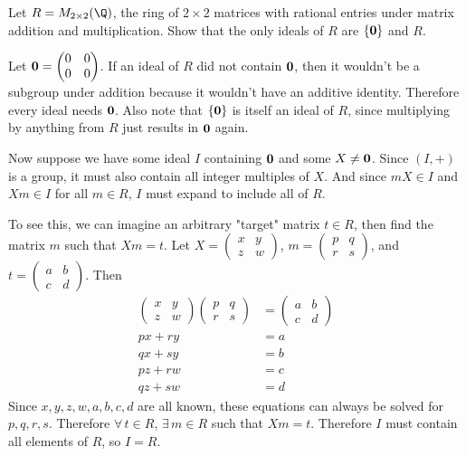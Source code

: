 \documentclass[a4paper]{article}
\begin{document}

\begin{questionbody}
Let $R = M_{2 \times 2}(\Q)$, the ring of $2 \times 2$ matrices with rational entries under matrix addition and multiplication. Show that the only ideals of $R$ are $\{\bf 0\}$ and $R$.
\end{questionbody}

Let $\bf 0 = \begin{pmatrix}0 & 0\\ 0 & 0\end{pmatrix}$. If an ideal of $R$ did not contain $\bf 0$, then it wouldn't be a subgroup under addition because it wouldn't have an additive identity. Therefore every ideal needs $\bf 0$. Also note that $\{ \bf 0 \}$ is itself an ideal of $R$, since multiplying by anything from $R$ just results in $\bf 0$ again.

Now suppose we have some ideal $I$ containing $\bf 0$ and some $X \ne \bf 0$. Since $(I, +)$ is a group, it must also contain all integer multiples of $X$. And since $mX \in I$ and $Xm \in I$ for all $m \in R$, $I$ must expand to include all of $R$.

To see this, we can imagine an arbitrary "target" matrix $t \in R$, then find the matrix $m$ such that $Xm = t$. Let $X = \begin{pmatrix}x & y\\ z & w\end{pmatrix}$, $m = \begin{pmatrix}p & q\\ r & s\end{pmatrix}$, and $t = \begin{pmatrix}a & b\\ c & d\end{pmatrix}$. Then \begin{align*}
	\begin{pmatrix}x & y\\ z & w\end{pmatrix} \begin{pmatrix}p & q\\ r & s\end{pmatrix} &= \begin{pmatrix}a & b\\ c & d\end{pmatrix}\\[1ex]
	px + ry &= a\\
	qx + sy &= b\\
	pz + rw &= c\\
	qz + sw &= d
\end{align*}
Since $x, y, z, w, a, b, c, d$ are all known, these equations can always be solved for $p, q, r, s$. Therefore $\forall\, t \in R$, $\exists\, m \in R$ such that $Xm = t$. Therefore $I$ must contain all elements of $R$, so $I = R$.
\end{document}
